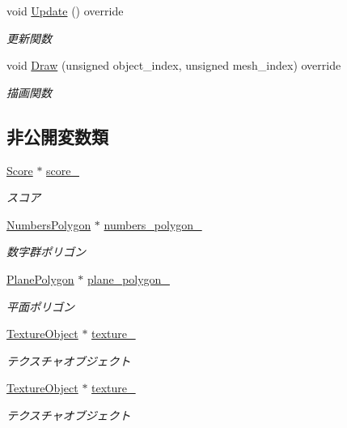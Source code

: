 \begin{DoxyCompactItemize}
void \mbox{\hyperlink{class_score_draw_a84fa10dee56f75616d4643b3568daf61}{Update}} () override
\begin{DoxyCompactList}\small\item\em 更新関数 \end{DoxyCompactList}\item 
void \mbox{\hyperlink{class_score_draw_a799e71943140a264cedba6002308b976}{Draw}} (unsigned object\+\_\+index, unsigned mesh\+\_\+index) override
\begin{DoxyCompactList}\small\item\em 描画関数 \end{DoxyCompactList}\end{DoxyCompactItemize}
\subsection*{非公開変数類}
\begin{DoxyCompactItemize}
\item 
\mbox{\hyperlink{class_score}{Score}} $\ast$ \mbox{\hyperlink{class_score_draw_ac58b7d10eb43266e90beca0145b6c703}{score\+\_\+}}
\begin{DoxyCompactList}\small\item\em スコア \end{DoxyCompactList}\item 
\mbox{\hyperlink{class_numbers_polygon}{Numbers\+Polygon}} $\ast$ \mbox{\hyperlink{class_score_draw_a482c9c3229fe705952efb6521b93220b}{numbers\+\_\+polygon\+\_\+}}
\begin{DoxyCompactList}\small\item\em 数字群ポリゴン \end{DoxyCompactList}\item 
\mbox{\hyperlink{class_plane_polygon}{Plane\+Polygon}} $\ast$ \mbox{\hyperlink{class_score_draw_ad824fcfba5e5588502fd54975f819972}{plane\+\_\+polygon\+\_\+}}
\begin{DoxyCompactList}\small\item\em 平面ポリゴン \end{DoxyCompactList}\item 
\mbox{\hyperlink{class_texture_object}{Texture\+Object}} $\ast$ \mbox{\hyperlink{class_score_draw_a872c53e6feeb4d68378f7dfc64b561d0}{texture\+\_\+}}
\begin{DoxyCompactList}\small\item\em テクスチャオブジェクト \end{DoxyCompactList}\item 
\mbox{\hyperlink{class_texture_object}{Texture\+Object}} $\ast$ \mbox{\hyperlink{class_score_draw_ab9917e429ef58b400f75f0a4b48968da}{texture\+\_}}
\begin{DoxyCompactList}\small\item\em テクスチャオブジェクト \end{DoxyCompactList}\end{DoxyCompactItemize}
